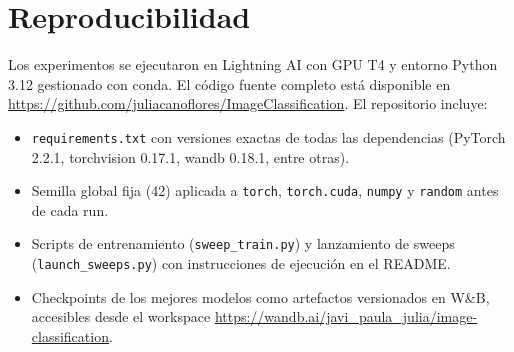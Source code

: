 \section{Reproducibilidad}

Los experimentos se ejecutaron en Lightning AI con GPU T4 y entorno Python 3.12 gestionado con conda. El código fuente completo está disponible en \url{https://github.com/juliacanoflores/ImageClassification}. El repositorio incluye:

\begin{itemize}\setlength\itemsep{2pt}
    \item \texttt{requirements.txt} con versiones exactas de todas las dependencias (PyTorch 2.2.1, torchvision 0.17.1, wandb 0.18.1, entre otras).
    \item Semilla global fija (42) aplicada a \texttt{torch}, \texttt{torch.cuda}, \texttt{numpy} y \texttt{random} antes de cada run.
    \item Scripts de entrenamiento (\texttt{sweep\_train.py}) y lanzamiento de sweeps (\texttt{launch\_sweeps.py}) con instrucciones de ejecución en el README.
    \item Checkpoints de los mejores modelos como artefactos versionados en W\&B, accesibles desde el workspace \url{https://wandb.ai/javi_paula_julia/image-classification}.
\end{itemize}
